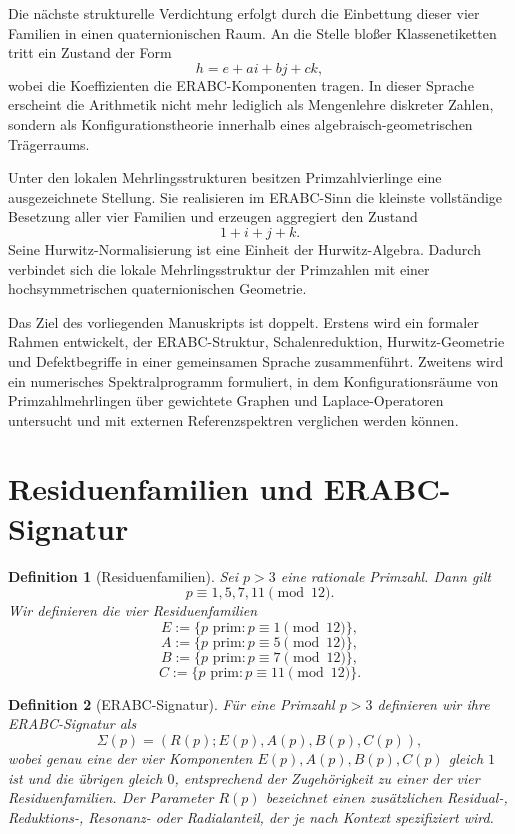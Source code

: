 \documentclass[11pt,a4paper]{article}
\newtheorem{definition}{Definition}
\begin{document}
Die nächste strukturelle Verdichtung erfolgt durch die Einbettung dieser vier Familien in einen quaternionischen Raum. An die Stelle bloßer Klassenetiketten tritt ein Zustand der Form
\[
h=e+ai+bj+ck,
\]
wobei die Koeffizienten die ERABC-Komponenten tragen. In dieser Sprache erscheint die Arithmetik nicht mehr lediglich als Mengenlehre diskreter Zahlen, sondern als Konfigurationstheorie innerhalb eines algebraisch-geometrischen Trägerraums.

Unter den lokalen Mehrlingsstrukturen besitzen Primzahlvierlinge eine ausgezeichnete Stellung. Sie realisieren im ERABC-Sinn die kleinste vollständige Besetzung aller vier Familien und erzeugen aggregiert den Zustand
\[
1+i+j+k.
\]
Seine Hurwitz-Normalisierung ist eine Einheit der Hurwitz-Algebra. Dadurch verbindet sich die lokale Mehrlingsstruktur der Primzahlen mit einer hochsymmetrischen quaternionischen Geometrie.

Das Ziel des vorliegenden Manuskripts ist doppelt. Erstens wird ein formaler Rahmen entwickelt, der ERABC-Struktur, Schalenreduktion, Hurwitz-Geometrie und Defektbegriffe in einer gemeinsamen Sprache zusammenführt. Zweitens wird ein numerisches Spektralprogramm formuliert, in dem Konfigurationsräume von Primzahlmehrlingen über gewichtete Graphen und Laplace-Operatoren untersucht und mit externen Referenzspektren verglichen werden können.

\section{Residuenfamilien und ERABC-Signatur}

\begin{definition}[Residuenfamilien]
Sei $p>3$ eine rationale Primzahl. Dann gilt
\[
p \equiv 1,5,7,11 \pmod{12}.
\]
Wir definieren die vier Residuenfamilien
\[
E := \{p \text{ prim} : p \equiv 1 \pmod{12}\},
\]
\[
A := \{p \text{ prim} : p \equiv 5 \pmod{12}\},
\]
\[
B := \{p \text{ prim} : p \equiv 7 \pmod{12}\},
\]
\[
C := \{p \text{ prim} : p \equiv 11 \pmod{12}\}.
\]
\end{definition}

\begin{definition}[ERABC-Signatur]
Für eine Primzahl $p>3$ definieren wir ihre ERABC-Signatur als
\[
\Sigma(p)=(R(p);E(p),A(p),B(p),C(p)),
\]
wobei genau eine der vier Komponenten $E(p),A(p),B(p),C(p)$ gleich $1$ ist und die übrigen gleich $0$, entsprechend der Zugehörigkeit zu einer der vier Residuenfamilien. Der Parameter $R(p)$ bezeichnet einen zusätzlichen Residual-, Reduktions-, Resonanz- oder Radialanteil, der je nach Kontext spezifiziert wird.
\end{definition}
\end{document}
